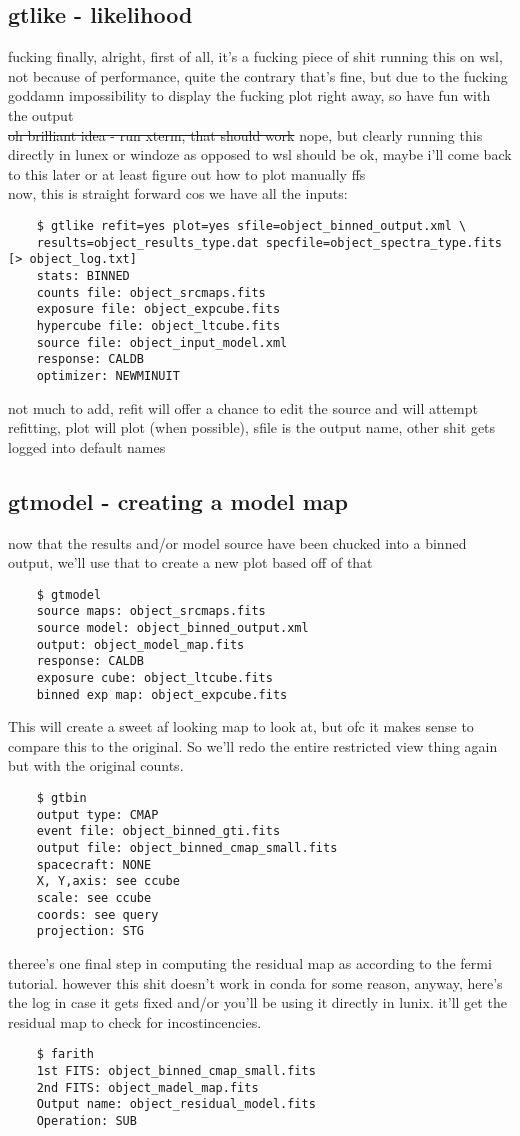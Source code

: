 \documentclass{article}
\begin{document}
\subsection{gtlike - likelihood}%
fucking finally, alright, first of all, it's a fucking piece of shit running this on wsl, not because of performance, quite the contrary that's fine, but due to the fucking goddamn impossibility to display the fucking plot right away, so have fun with the output\\
\sout{oh brilliant idea - run xterm, that should work} nope, but clearly running this directly in lunex or windoze as opposed to wsl should be ok, maybe i'll come back to this later or at least figure out how to plot manually ffs\\
now, this is straight forward cos we have all the inputs:
\begin{verbatim}
    $ gtlike refit=yes plot=yes sfile=object_binned_output.xml \
    results=object_results_type.dat specfile=object_spectra_type.fits [> object_log.txt]
    stats: BINNED
    counts file: object_srcmaps.fits
    exposure file: object_expcube.fits
    hypercube file: object_ltcube.fits
    source file: object_input_model.xml
    response: CALDB
    optimizer: NEWMINUIT
\end{verbatim}
not much to add, refit will offer a chance to edit the source and will attempt refitting, plot will plot (when possible), sfile is the output name, other shit gets logged into default names

\subsection{gtmodel - creating a model map}%
now that the results and/or model source have been chucked into a binned output, we'll use that to create a new plot based off of that
\begin{verbatim}
    $ gtmodel
    source maps: object_srcmaps.fits
    source model: object_binned_output.xml
    output: object_model_map.fits
    response: CALDB
    exposure cube: object_ltcube.fits
    binned exp map: object_expcube.fits
\end{verbatim}
This will create a sweet af looking map to look at, but ofc it makes sense to compare this to the original. So we'll redo the entire restricted view thing again but with the original counts.
\begin{verbatim}
    $ gtbin
    output type: CMAP
    event file: object_binned_gti.fits
    output file: object_binned_cmap_small.fits
    spacecraft: NONE
    X, Y,axis: see ccube
    scale: see ccube
    coords: see query
    projection: STG
\end{verbatim}
theree's one final step in computing the residual map as according to the fermi tutorial. however this shit doesn't work in conda for some reason, anyway, here's the log in case it gets fixed and/or you'll be using it directly in lunix. it'll get the residual map to check for incostincencies.
\begin{verbatim}
    $ farith
    1st FITS: object_binned_cmap_small.fits
    2nd FITS: object_madel_map.fits
    Output name: object_residual_model.fits
    Operation: SUB
\end{verbatim}
\end{document}
